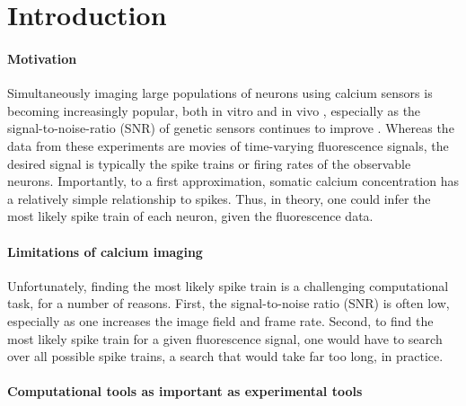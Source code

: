 \section{Introduction}

\paragraph{Motivation}

Simultaneously imaging large populations of neurons using calcium sensors is becoming increasingly popular, both in vitro  \cite{ImagingManual} and in vivo \cite{NagayamaChen07, GobelHelmchen07, LuoSvoboda08}, especially as the signal-to-noise-ratio (SNR) of genetic sensors continues to improve \cite{GaraschukKonnerth07, MankGriesbeck08, WallaceHasan08}. Whereas the data from these experiments are movies of time-varying fluorescence signals, the desired signal is typically the spike trains or firing rates of the observable neurons.  Importantly, to a first approximation, somatic calcium concentration has a relatively simple relationship to spikes.  Thus, in theory, one could infer the most likely spike train of each neuron, given the fluorescence data.  

\paragraph{Limitations of calcium imaging}

Unfortunately, finding the most likely spike train is a challenging computational task, for a number of reasons.  First, the signal-to-noise ratio (SNR) is often low, especially as one increases the image field and frame rate.  Second, to find the most likely spike train for a given fluorescence signal, one would have to search over all possible spike trains, a search that would take far too long, in practice.  

\paragraph{Computational tools as important as experimental tools}

